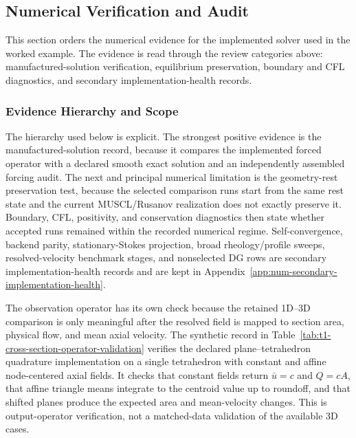 \subsection{Numerical Verification and Audit}
\label{sec:numerical-verification}

This section orders the numerical evidence for the implemented solver used in
the worked example. The evidence is read through the review categories above:
manufactured-solution verification, equilibrium preservation, boundary and CFL
diagnostics, and secondary implementation-health records.

\subsubsection{Evidence Hierarchy and Scope}
\label{subsec:verification-scope-convergence-stability}

The hierarchy used below is explicit. The strongest positive evidence is the
manufactured-solution record, because it compares the implemented forced
operator with a declared smooth exact solution and an independently assembled
forcing audit. The next and principal numerical limitation is the geometry-rest
preservation test, because the selected comparison runs start from the same rest
state and the current MUSCL/Rusanov realization does not exactly preserve it.
Boundary, CFL, positivity, and conservation diagnostics then state whether
accepted runs remained within the recorded numerical regime.
Self-convergence, backend parity, stationary-Stokes projection, broad
rheology/profile sweeps, resolved-velocity benchmark stages, and nonselected DG
rows are secondary implementation-health records and are kept in
Appendix~\ref{app:num-secondary-implementation-health}.

The observation operator has its own check because the retained 1D--3D
comparison is only meaningful after the resolved field is mapped to section
area, physical flow, and mean axial velocity. The synthetic record in
Table~\ref{tab:t1-cross-section-operator-validation} verifies the declared
plane--tetrahedron quadrature implementation on a single tetrahedron with
constant and affine node-centered axial fields. It checks that constant fields
return $\bar u=c$ and $Q=cA$, that affine triangle means integrate to the
centroid value up to roundoff, and that shifted planes produce the expected
area and mean-velocity changes. This is output-operator verification, not a
matched-data validation of the available 3D cases.

